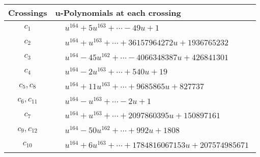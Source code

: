 \documentclass[1p]{elsarticle_modified}
\theoremstyle{definition}
\begin{document}
\begin{tabular}{m{50pt}|m{274pt}}
Crossings & \hspace{64pt}u-Polynomials at each crossing \\
\hline $$\begin{aligned}c_{1}\end{aligned}$$&$\begin{aligned}
&u^{164}+5 u^{163}+\cdots-49 u+1
\end{aligned}$\\
\hline $$\begin{aligned}c_{2}\end{aligned}$$&$\begin{aligned}
&u^{164}+u^{163}+\cdots+36157964272 u+1936765232
\end{aligned}$\\
\hline $$\begin{aligned}c_{3}\end{aligned}$$&$\begin{aligned}
&u^{164}-45 u^{162}+\cdots-4066348387 u+426841301
\end{aligned}$\\
\hline $$\begin{aligned}c_{4}\end{aligned}$$&$\begin{aligned}
&u^{164}-2 u^{163}+\cdots+540 u+19
\end{aligned}$\\
\hline $$\begin{aligned}c_{5},c_{8}\end{aligned}$$&$\begin{aligned}
&u^{164}+11 u^{163}+\cdots+9685865 u+827737
\end{aligned}$\\
\hline $$\begin{aligned}c_{6},c_{11}\end{aligned}$$&$\begin{aligned}
&u^{164}- u^{163}+\cdots-2 u+1
\end{aligned}$\\
\hline $$\begin{aligned}c_{7}\end{aligned}$$&$\begin{aligned}
&u^{164}+u^{163}+\cdots+2097860395 u+150897161
\end{aligned}$\\
\hline $$\begin{aligned}c_{9},c_{12}\end{aligned}$$&$\begin{aligned}
&u^{164}-50 u^{162}+\cdots+992 u+1808
\end{aligned}$\\
\hline $$\begin{aligned}c_{10}\end{aligned}$$&$\begin{aligned}
&u^{164}+6 u^{163}+\cdots+1784816067153 u+207574985671
\end{aligned}$\\
\hline
\end{tabular}\\~\\
\end{document}
